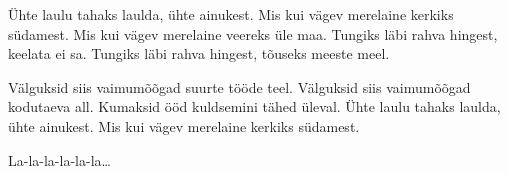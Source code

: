 \"Uhte laulu tahaks laulda, \"uhte ainukest.
Mis kui v\"agev merelaine kerkiks s\"udamest.
Mis kui v\"agev merelaine veereks \"ule maa.
Tungiks l\"abi rahva hingest, keelata ei sa.
Tungiks l\"abi rahva hingest, t\~ouseks meeste meel.

V\"alguksid siis vaimum\~o\~ogad suurte t\"o\"ode teel.
V\"alguksid siis vaimum\~o\~ogad kodutaeva all.
Kumaksid \"o\"od kuldsemini t\"ahed \"uleval.
\"Uhte laulu tahaks laulda, \"uhte ainukest.
Mis kui v\"agev merelaine kerkiks s\"udamest.

La-la-la-la-la-la\ldots